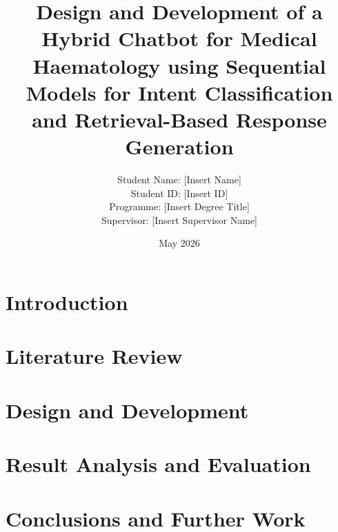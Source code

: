\documentclass[a4paper,11pt]{article}
\title{Design and Development of a Hybrid Chatbot for Medical Haematology using Sequential Models for Intent Classification and Retrieval-Based Response Generation}
\author{Student Name: [Insert Name] \\ Student ID: [Insert ID] \\ Programme: [Insert Degree Title] \\ Supervisor: [Insert Supervisor Name]}
\date{May 2026}
\begin{document}
\maketitle

\begin{abstract}

\end{abstract}

\section{Introduction}
\label{sec:introduction}


\section{Literature Review}
\label{sec:literature-review}


\section{Design and Development}
\label{sec:design-development}


\section{Result Analysis and Evaluation}
\label{sec:results-evaluation}


\section{Conclusions and Further Work}
\label{sec:conclusion}


\nocite{denecke2022,graves2005,hochreiter1997,kreuzberger2023,milneives2020,salton1988,sculley2015,tudorcar2020}
\printbibliography[title={References}]
\end{document}

